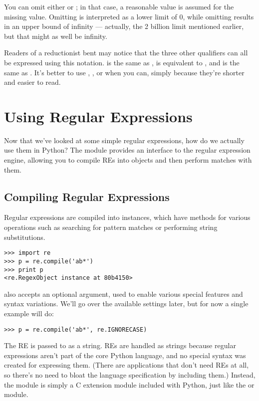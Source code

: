 \documentclass{howto}
\begin{document}
You can omit either  or ; in that case, a reasonable
value is assumed for the missing value.  Omitting  is
interpreted as a lower limit of 0, while omitting  results in  an
upper bound of infinity --- actually, the 2 billion limit mentioned
earlier, but that might as well be infinity.  

Readers of a reductionist bent may notice that the three other qualifiers
can all be expressed using this notation.   is the same
as \regexp{*},  is equivalent to \regexp{+}, and
 is the same as .  It's better to use
\regexp{*}, \regexp{+}, or  when you can, simply because
they're shorter and easier to read.

\section{Using Regular Expressions}

Now that we've looked at some simple regular expressions, how do we
actually use them in Python?  The  module provides an
interface to the regular expression engine, allowing you to compile
REs into objects and then perform matches with them.

\subsection{Compiling Regular Expressions}

Regular expressions are compiled into  instances,
which have methods for various operations such as searching for
pattern matches or performing string substitutions.

\begin{verbatim}
>>> import re
>>> p = re.compile('ab*')
>>> print p
<re.RegexObject instance at 80b4150>
\end{verbatim}

 also accepts an optional 
argument, used to enable various special features and syntax
variations.  We'll go over the available settings later, but for now a
single example will do:

\begin{verbatim}
>>> p = re.compile('ab*', re.IGNORECASE)
\end{verbatim}

The RE is passed to  as a string.  REs are
handled as strings because regular expressions aren't part of the core
Python language, and no special syntax was created for expressing
them.  (There are applications that don't need REs at all, so there's
no need to bloat the language specification by including them.)
Instead, the  module is simply a C extension module
included with Python, just like the  or 
module.
\end{document}

